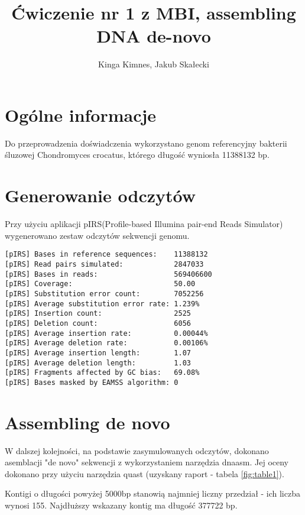 \documentclass[a4paper]{article}
\begin{document}
\title{Ćwiczenie nr 1 z MBI, assembling DNA de-novo}
\author{Kinga Kimnes, Jakub Skałecki}
\maketitle

\section{Ogólne informacje}

Do przeprowadzenia doświadczenia wykorzystano genom referencyjny bakterii śluzowej Chondromyces crocatus, którego długość wyniosła 11388132 bp.


\section{Generowanie odczytów}

Przy użyciu aplikacji pIRS(Profile-based Illumina pair-end Reads Simulator) wygenerowano zestaw odczytów sekwencji genomu.

\begin{verbatim}
[pIRS] Bases in reference sequences:    11388132
[pIRS] Read pairs simulated:            2847033
[pIRS] Bases in reads:                  569406600
[pIRS] Coverage:                        50.00
[pIRS] Substitution error count:        7052256
[pIRS] Average substitution error rate: 1.239%
[pIRS] Insertion count:                 2525
[pIRS] Deletion count:                  6056
[pIRS] Average insertion rate:          0.00044%
[pIRS] Average deletion rate:           0.00106%
[pIRS] Average insertion length:        1.07
[pIRS] Average deletion length:         1.03
[pIRS] Fragments affected by GC bias:   69.08%
[pIRS] Bases masked by EAMSS algorithm: 0
\end{verbatim}

\section{Assembling de novo}

W dalszej kolejności, na podstawie zasymulowanych odczytów, dokonano asemblacji "de novo" sekwencji  z wykorzystaniem narzędzia dnaasm.
Jej oceny dokonano przy użyciu narzędzia quast (uzyskany raport - tabela \ref{fig:table1}).

Kontigi o długości powyżej 5000bp stanowią najmniej liczny przedział - ich liczba wynosi 155. Najdłuższy wskazany kontig ma długość 377722 bp.
\end{document}
